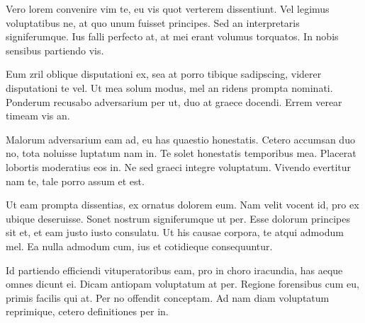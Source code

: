 \documentclass[11pt,]{book}
\begin{document}
Vero lorem convenire vim te, eu vis quot verterem dissentiunt. Vel
legimus voluptatibus ne, at quo unum fuisset principes. Sed an
interpretaris signiferumque. Ius falli perfecto at, at mei erant volumus
torquatos. In nobis sensibus partiendo vis.

Eum zril oblique disputationi ex, sea at porro tibique sadipscing,
viderer disputationi te vel. Ut mea solum modus, mel an ridens prompta
nominati. Ponderum recusabo adversarium per ut, duo at graece docendi.
Errem verear timeam vis an.

Malorum adversarium eam ad, eu has quaestio honestatis. Cetero accumsan
duo no, tota noluisse luptatum nam in. Te solet honestatis temporibus
mea. Placerat lobortis moderatius eos in. Ne sed graeci integre
voluptatum. Vivendo evertitur nam te, tale porro assum et est.

Ut eam prompta dissentias, ex ornatus dolorem eum. Nam velit vocent id,
pro ex ubique deseruisse. Sonet nostrum signiferumque ut per. Esse
dolorum principes sit et, et eam justo iusto consulatu. Ut his causae
corpora, te atqui admodum mel. Ea nulla admodum cum, ius et cotidieque
consequuntur.

Id partiendo efficiendi vituperatoribus eam, pro in choro iracundia, has
aeque omnes dicunt ei. Dicam antiopam voluptatum at per. Regione
forensibus cum eu, primis facilis qui at. Per no offendit conceptam. Ad
nam diam voluptatum reprimique, cetero definitiones per in.
\end{document}
